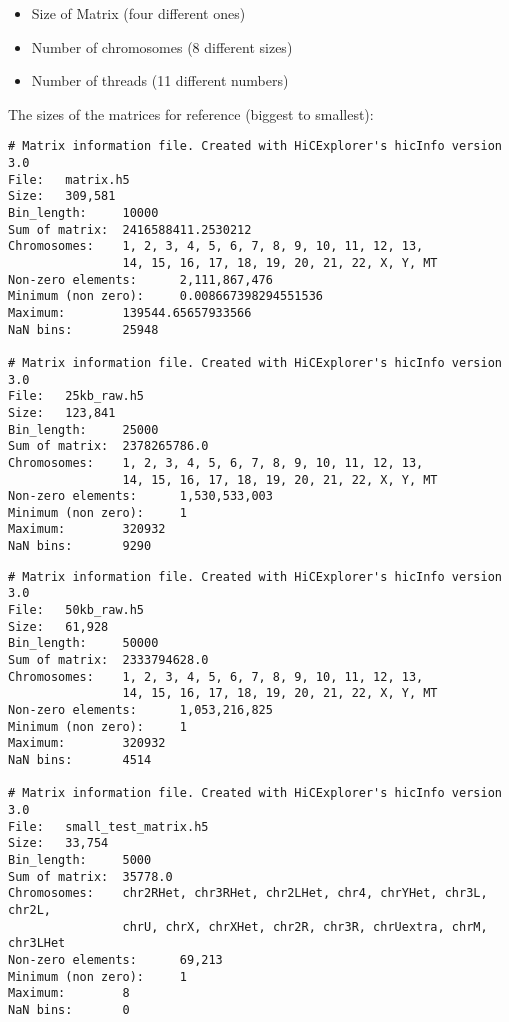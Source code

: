 \begin{itemize}
    \item Size of Matrix (four different ones)
    \item Number of chromosomes (8 different sizes)
    \item Number of threads (11 different numbers)
\end{itemize}


\newpage
The sizes of the matrices for reference (biggest to smallest):

\begin{verbatim}
# Matrix information file. Created with HiCExplorer's hicInfo version 3.0
File:   matrix.h5
Size:   309,581
Bin_length:     10000
Sum of matrix:  2416588411.2530212
Chromosomes:    1, 2, 3, 4, 5, 6, 7, 8, 9, 10, 11, 12, 13,
                14, 15, 16, 17, 18, 19, 20, 21, 22, X, Y, MT
Non-zero elements:      2,111,867,476
Minimum (non zero):     0.008667398294551536
Maximum:        139544.65657933566
NaN bins:       25948

# Matrix information file. Created with HiCExplorer's hicInfo version 3.0
File:   25kb_raw.h5
Size:   123,841
Bin_length:     25000
Sum of matrix:  2378265786.0
Chromosomes:    1, 2, 3, 4, 5, 6, 7, 8, 9, 10, 11, 12, 13,
                14, 15, 16, 17, 18, 19, 20, 21, 22, X, Y, MT
Non-zero elements:      1,530,533,003
Minimum (non zero):     1
Maximum:        320932
NaN bins:       9290
\end{verbatim}
\newpage
\begin{verbatim}
# Matrix information file. Created with HiCExplorer's hicInfo version 3.0
File:   50kb_raw.h5
Size:   61,928
Bin_length:     50000
Sum of matrix:  2333794628.0
Chromosomes:    1, 2, 3, 4, 5, 6, 7, 8, 9, 10, 11, 12, 13,
                14, 15, 16, 17, 18, 19, 20, 21, 22, X, Y, MT
Non-zero elements:      1,053,216,825
Minimum (non zero):     1
Maximum:        320932
NaN bins:       4514

# Matrix information file. Created with HiCExplorer's hicInfo version 3.0
File:   small_test_matrix.h5
Size:   33,754
Bin_length:     5000
Sum of matrix:  35778.0
Chromosomes:    chr2RHet, chr3RHet, chr2LHet, chr4, chrYHet, chr3L, chr2L,
                chrU, chrX, chrXHet, chr2R, chr3R, chrUextra, chrM, chr3LHet
Non-zero elements:      69,213
Minimum (non zero):     1
Maximum:        8
NaN bins:       0
\end{verbatim}

